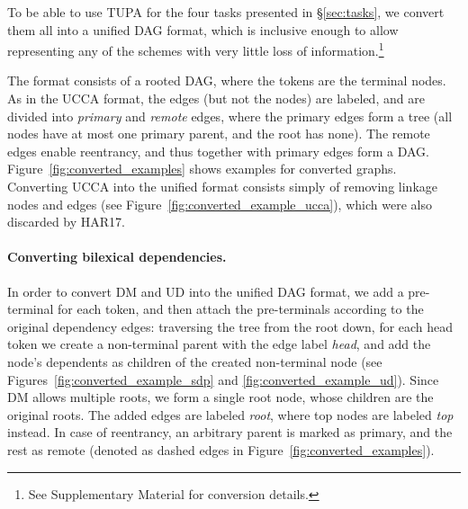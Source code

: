 \documentclass[11pt,a4paper]{article}
\begin{document}
To be able to use TUPA for the four tasks presented in \S\ref{sec:tasks},
we convert them all into a unified DAG format, which is inclusive enough to
allow representing any of the schemes with very little loss of information.\footnote{See
Supplementary Material for conversion details.}

The format consists of a rooted DAG, where the tokens are the terminal nodes.
As in the UCCA format, the edges (but not the nodes) are labeled,
and are divided into \textit{primary} and \textit{remote} edges,
where the primary edges form a tree (all nodes have at most one primary parent,
and the root has none).
The remote edges enable reentrancy, and thus together with primary edges
form a DAG.
Figure~\ref{fig:converted_examples} shows examples for converted graphs.
Converting UCCA into the unified format consists simply of removing linkage 
nodes and edges (see Figure~\ref{fig:converted_example_ucca}), which were
also discarded by HAR17.

\paragraph{Converting bilexical dependencies.}
In order to convert DM and UD into the unified DAG format,
we add a pre-terminal for each token,
and then attach the pre-terminals according to the original dependency edges:
traversing the tree from the root down, for each head token we create a non-terminal
parent with the edge label {\it head},
and add the node's dependents as children of the created non-terminal node
(see Figures~\ref{fig:converted_example_sdp} and \ref{fig:converted_example_ud}).
Since DM allows multiple roots, we form a single root node, whose children
are the original roots. The added edges are labeled \textit{root}, where
top nodes are labeled \textit{top} instead.
In case of reentrancy, an arbitrary parent is marked as primary, and the rest as remote
(denoted as dashed edges in Figure~\ref{fig:converted_examples}).
\end{document}
